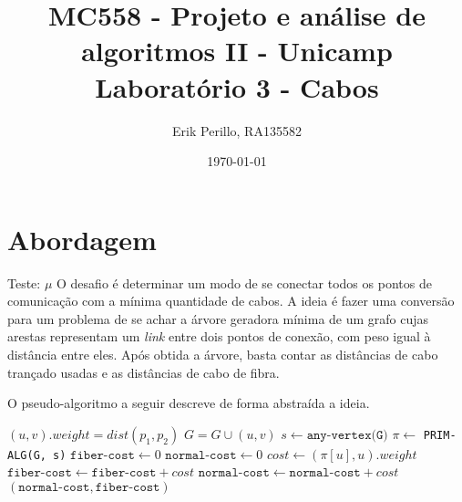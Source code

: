 \documentclass[7pt]{article}
\newcommand{\tit}[1]{\textit{#1}}
\newcommand{\ttt}[1]{\texttt{#1}}
\begin{document}

\author{Erik Perillo, RA135582}
\date{\today}
\title{%
	{\small MC558 - Projeto e análise de algoritmos II - Unicamp}\\
	{\Large Laboratório 3 - Cabos}}
\maketitle\vspace{-0.5cm}
\posttitle{\par\end{center}}

\makeatletter
\def\BState{\State\hskip-\ALG@thistlm}
\makeatother


\section{Abordagem}
Teste: $\mu$
O desafio é determinar um modo de se conectar todos os pontos de comunicação
com a mínima quantidade de cabos.
A ideia é fazer uma conversão para um problema de se achar a árvore geradora
mínima de um grafo cujas arestas representam um \tit{link} entre dois pontos
de conexão, com peso igual à distância entre eles.
Após obtida a árvore, basta contar as distâncias de cabo trançado usadas
e as distâncias de cabo de fibra.

O pseudo-algoritmo a seguir descreve de forma abstraída a ideia.
\begin{algorithm}
\caption{}\label{Cabos}
\begin{algorithmic}[1]
        \State $(u, v).weight = dist(p_1, p_2)$
        \State $G = G \cup (u, v)$
	\EndFor
    \State $s \gets \ttt{any-vertex(G)}$
    \State $\pi \gets$ \ttt{PRIM-ALG(G, s)}
    \State $\ttt{fiber-cost} \gets 0$
    \State $\ttt{normal-cost} \gets 0$
        \State $cost \gets (\pi[u], u).weight$
        \If{$cost > \ttt{fiber-thresh}$}
            \State $\ttt{fiber-cost} \gets \ttt{fiber-cost} + cost$
        \Else
            \State $\ttt{normal-cost} \gets \ttt{normal-cost} + cost$
        \EndIf
	\EndFor
    \Return $(\ttt{normal-cost}, \ttt{fiber-cost})$
    \EndProcedure
\end{algorithmic}
\end{algorithm}
\end{document}
